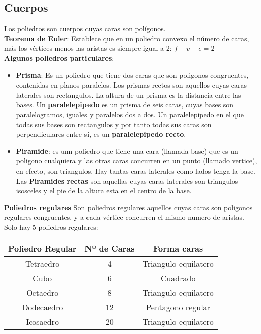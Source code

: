 \documentclass[10pt]{article}
\begin{document}
\subsection{Cuerpos}
Los poliedros son cuerpos cuyas caras son polígonos.\\
\textbf{Teorema de Euler}: Establece que en un poliedro convexo el número de caras, más los vértices menos las aristas es siempre igual a 2: $f+v-e = 2$\\
\textbf{Algunos poliedros particulares}:
\begin{itemize}
\item \textbf{Prisma}: Es un poliedro que tiene dos caras que son poligonos congruentes, contenidas en planos paralelos. Los prismas rectos son aquellos cuyas caras laterales son rectangulos. La altura de un prisma es la distancia entre las bases. Un \textbf{paralelepipedo} es un prisma de seis caras, cuyas bases son paralelogramos, iguales y paralelos dos a dos. Un paralelepipedo en el que todas sus bases son rectangulos y por tanto todas sus caras son perpendiculares entre si, es un \textbf{paralelepipedo recto}.
\item \textbf{Piramide}: es unn poliedro que tiene una cara (llamada base) que es un poligono cualquiera y las otras caras concurren en un punto (llamado vertice), en efecto, son triangulos. Hay tantas caras laterales como lados tenga la base. Las \textbf{Piramides rectas} son aquellas cuyas caras laterales son triangulos isosceles y el pie de la altura esta en el centro de la base.
\end{itemize}
\textbf{Poliedros regulares}
Son poliedros regulares aquellos cuyas caras son poligonos regulares congruentes, y a cada vértice concurren el mismo numero de aristas. Solo hay 5 poliedros regulares:
\begin{table}[h]
\begin{center}
\begin{tabular}{|c|c|c|}
\hline
Poliedro Regular & Nº de Caras & Forma caras \\
\hline
Tetraedro & 4 & Triangulo equilatero\\
Cubo & 6 & Cuadrado\\
Octaedro & 8 & Triangulo equilatero\\
Dodecaedro & 12 & Pentagono regular\\
Icosaedro & 20 & Triangulo equilatero\\
\hline
\end{tabular}
\end{center}
\end{table}
\end{document}
